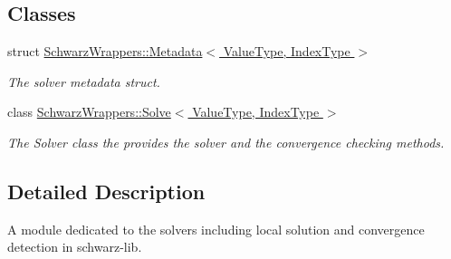 \subsection*{Classes}
\begin{DoxyCompactItemize}
\item 
struct \hyperlink{structSchwarzWrappers_1_1Metadata}{Schwarz\+Wrappers\+::\+Metadata$<$ Value\+Type, Index\+Type $>$}
\begin{DoxyCompactList}\small\item\em The solver metadata struct. \end{DoxyCompactList}\item 
class \hyperlink{classSchwarzWrappers_1_1Solve}{Schwarz\+Wrappers\+::\+Solve$<$ Value\+Type, Index\+Type $>$}
\begin{DoxyCompactList}\small\item\em The Solver class the provides the solver and the convergence checking methods. \end{DoxyCompactList}\end{DoxyCompactItemize}


\subsection{Detailed Description}
A module dedicated to the solvers including local solution and convergence detection in schwarz-\/lib. 


